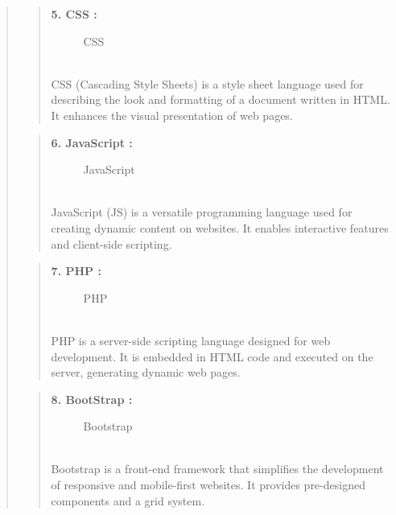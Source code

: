 \documentclass[12pt]{report}
\begin{document}
\begin{quote}
		
		\begin{quote}
			\textbf{5. CSS :}
			\begin{figure}[h]
				\centering
				\caption{CSS}
				\vspace{0.5cm}
			\end{figure}
			\\CSS (Cascading Style Sheets) is a style sheet language used for describing the look and formatting of a document written in HTML. It enhances the visual presentation of web pages.
		\end{quote}
		
		\begin{quote}
			\textbf{6. JavaScript :}
			\begin{figure}[h]
				\centering
				\caption{JavaScript}
				\vspace{0.5cm}
			\end{figure}
			\\JavaScript (JS) is a versatile programming language used for creating dynamic content on websites. It enables interactive features and client-side scripting.
		\end{quote}
		\clearpage
		\begin{quote}
			\textbf{7. PHP :}
			\begin{figure}[h]
				\centering
				\caption{PHP}
				\vspace{0.5cm}
			\end{figure}
			\\PHP is a server-side scripting language designed for web development. It is embedded in HTML code and executed on the server, generating dynamic web pages.
		\end{quote}
		
		\begin{quote}
			\textbf{8. BootStrap :}
			\begin{figure}[h]
				\centering
				\caption{Bootstrap}
				\vspace{0.5cm}
			\end{figure}
			\\Bootstrap is a front-end framework that simplifies the development of responsive and mobile-first websites. It provides pre-designed components and a grid system.
		\end{quote}
	\end{quote}
	\clearpage
	
\end{document}
